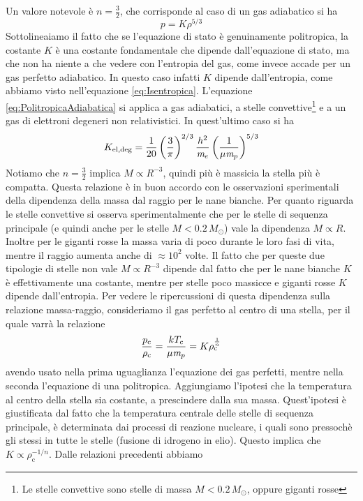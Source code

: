 Un valore notevole è $n=\frac{3}{2}$, che corrisponde al caso di un gas adiabatico si ha
\begin{equation}
p=K \rho^{5/3} \label{eq:PolitropicaAdiabatica}
\end{equation}
Sottolineaiamo il fatto che se l'equazione di stato è genuinamente politropica, la costante $K$ è una costante fondamentale che dipende dall'equazione di stato, ma che non ha niente a che vedere con l'entropia del gas, come invece accade per un gas perfetto adiabatico. In questo caso infatti $K$ dipende dall'entropia, come abbiamo visto nell'equazione \ref{eq:Isentropica}. L'equazione \ref{eq:PolitropicaAdiabatica} si applica a gas adiabatici, a stelle convettive\footnote{Le stelle convettive sono stelle di massa $M<0.2\, M_\odot$, oppure giganti rosse} e a un gas di elettroni degeneri non relativistici. In quest'ultimo caso si ha
\begin{equation}
K_\mathrm{el, deg} = \frac{1}{20}\left( \frac{3}{\pi} \right)^{2/3} \frac{h^2}{\textit{m}_{e}} \left( \frac{1}{\mu \textit{m}_{p}} \right) ^{5/3}
\end{equation}
Notiamo che $n=\frac{3}{2}$ implica $M\propto R^{-3}$, quindi più è massicia la stella più è compatta. Questa relazione è in buon accordo con le osservazioni sperimentali della dipendenza della massa dal raggio per le nane bianche. Per quanto riguarda le stelle convettive si osserva sperimentalmente che per le stelle di sequenza principale (e quindi anche per le stelle $M<0.2\,M_\odot$) vale la dipendenza $M\propto R$. Inoltre per le giganti rosse la massa varia di poco durante le loro fasi di vita, mentre il raggio aumenta anche di $\approx 10^2$ volte. Il fatto che per queste due tipologie di stelle non vale $M\propto R^{-3}$ dipende dal fatto che per le nane bianche $K$ è effettivamente una costante, mentre per stelle poco massicce e giganti rosse $K$ dipende dall'entropia. Per vedere le ripercussioni di questa dipendenza sulla relazione massa-raggio, consideriamo il gas perfetto al centro di una stella, per il quale varrà la relazione 
\begin{equation}
\frac{p_\mathrm{c}}{\rho_\mathrm{c}} = \frac{k T_\mathrm{c}}{\mu \textit{m}_{p}} = K \rho_\mathrm{c} ^\frac{1}{n}
\end{equation}
avendo usato nella prima uguaglianza l'equazione dei gas perfetti, mentre nella seconda l'equazione di una politropica. Aggiungiamo l'ipotesi che la temperatura al centro della stella sia costante, a prescindere dalla sua massa. Quest'ipotesi è giustificata dal fatto che la temperatura centrale delle stelle di sequenza principale, è determinata dai processi di reazione nucleare, i quali sono pressochè gli stessi in tutte le stelle (fusione di idrogeno in elio). Questo implica che $K\propto \rho_\mathrm{c}^{-1/n}$. Dalle relazioni precedenti abbiamo
